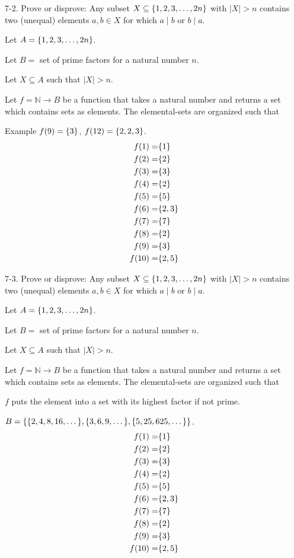 \documentclass{idrisMemo}
\begin{document}
\begin{prooflist}{7-2. Prove or disprove: Any subset $X \subseteq\{1,2,3, \ldots,
    2 n\}$ with $|X|>n$ contains two (unequal) elements $a, b \in X$ for which
$a \mid b$ or $b \mid a$.}
\item Let $A=\{1,2,3, \ldots, 2 n\}$.
\item Let $B=$ set of prime factors for a natural number $n$.
\item Let $X\subseteq A$ such that $|X|>n$.
\item Let $f=\mathbb{N} \rightarrow B $ be a function that takes a natural
    number and returns a set which contains sets as elements. The elemental-sets
    are organized such that
\item Example $f(9) = \{3\}$, $f(12) = \{2, 2, 3\}$.
\begin{align*}
    f(1) =& \{1\}\\
    f(2) =& \{2\}\\
    f(3) =& \{3\}\\
    f(4) =& \{2\}\\
    f(5) =& \{5\}\\
    f(6) =& \{2, 3\}\\
    f(7) =& \{7\}\\
    f(8) =& \{2\}\\
    f(9) =& \{3\}\\
    f(10) =& \{2, 5\}
\end{align*}
\end{prooflist}

\begin{prooflist}{7-3. Prove or disprove: Any subset $X \subseteq\{1,2,3, \ldots,
    2 n\}$ with $|X|>n$ contains two (unequal) elements $a, b \in X$ for which
$a \mid b$ or $b \mid a$.}
\item Let $A=\{1,2,3, \ldots, 2 n\}$.
\item Let $B=$ set of prime factors for a natural number $n$.
\item Let $X\subseteq A$ such that $|X|>n$.
\item Let $f=\mathbb{N} \rightarrow B $ be a function that takes a natural
    number and returns a set which contains sets as elements. The elemental-sets
    are organized such that
\item $f$ puts the element into a set with its highest factor if not prime.
\item $B=\{\{2, 4, 8, 16,\dots\}, \{3, 6, 9, \dots\}, \{5, 25, 625,
    \dots\}\}$.
\begin{align*}
    f(1) =& \{1\}\\
    f(2) =& \{2\}\\
    f(3) =& \{3\}\\
    f(4) =& \{2\}\\
    f(5) =& \{5\}\\
    f(6) =& \{2, 3\}\\
    f(7) =& \{7\}\\
    f(8) =& \{2\}\\
    f(9) =& \{3\}\\
    f(10) =& \{2, 5\}
\end{align*}
\end{prooflist}
\end{document}
